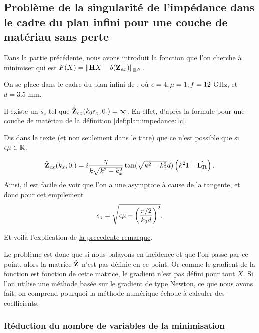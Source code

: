 \subsection{Problème de la singularité de l'impédance dans le cadre du plan infini pour une couche de matériau sans perte}

Dans la partie précédente, nous avons introduit la fonction
que l'on cherche à minimiser qui est \(F(X) = \left\lVert{\mathbf{H}} X - b(\mathbf{Z}_{ex})\right\rVert_{\mathbb R^N}\).

On se place dans le cadre du plan infini de \cite{aubakirov_electromagnetic_2014}, où \(\epsilon=4,\mu=1,f=12\) GHz, et \(d=3.5\) mm. %

Il existe un \(s_z\) tel que \(\hat{\mathbf{Z}}_{ex}(k_0s_z,0.) = \infty\). En effet, d'après la formule pour une couche de matériau de la définition \ref{def:plan:impedance:1c}, 
\begin{REM}
  Dis dans le texte (et non seulement dans le titre) que ce n'est possible que si \(\epsilon\mu\in\mathbb R\).
\end{REM}
\begin{equation}
  \hat{\mathbf{Z}}_{ex}(k_x,0.) = i\dfrac{\eta}{k\sqrt{k^2 - k_x^2}}\tan(\sqrt{k^2 - k_x^2}d)\left(k^2\mathbf{I} - \hat{\mathbf{L_R}}\right).
\end{equation}
Ainsi, il est facile de voir que l'on a une asymptote à cause de la tangente, et donc pour cet empilement
\begin{equation}
  s_z = \sqrt{\epsilon \mu - \left(\dfrac{\pi/2}{k_0 d}\right)^2}.
\end{equation}
\begin{REM}[asymptote]
  Et voilà l'explication de \hyperlink{REMnoasymptote}{la precedente remarque}.
\end{REM}
Le problème est donc que si nous balayons en incidence et que l'on passe par ce point, alors la matrice \(\hat{\mathbf{Z}}\) n'est pas définie en ce point. Or comme le gradient de la fonction est fonction de cette matrice, le gradient n'est pas défini pour tout \(X\). Si l'on utilise une méthode basée sur le gradient de type Newton, ce que nous avons fait, on comprend pourquoi la méthode numérique échoue à calculer des coefficients.

\subsubsection{Réduction du nombre de variables de la minimisation}

